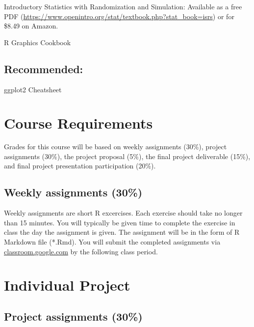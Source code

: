 \documentclass[]{book}
\begin{document}
Introductory Statistics with Randomization and Simulation: Available as
a free PDF
(\url{https://www.openintro.org/stat/textbook.php?stat_book=isrs}) or
for \$8.49 on Amazon.

R Graphics Cookbook

\subsection*{Recommended:}\label{recommended}

ggplot2 Cheatsheet

\section*{Course Requirements}\label{course-requirements}

Grades for this course will be based on weekly assignments (30\%),
project assignments (30\%), the project proposal (5\%), the final
project deliverable (15\%), and final project presentation participation
(20\%).

\subsection*{Weekly assignments (30\%)}\label{weekly-assignments-30}

Weekly assignments are short R excercises. Each exercise should take no
longer than 15 minutes. You will typically be given time to complete the
exercise in class the day the assignment is given. The assignment will
be in the form of R Markdown file (*.Rmd). You will submit the completed
assignments via \href{https//classroom.google.com}{classroom.google.com}
by the following class period.

\section*{Individual Project}\label{individual-project}

\subsection*{Project assignments (30\%)}\label{project-assignments-30}
\end{document}
